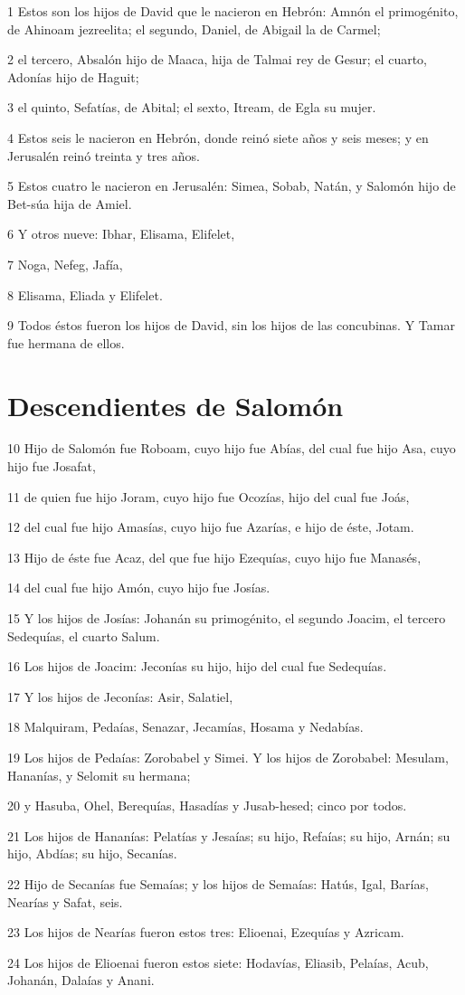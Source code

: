 \par 1 Estos son los hijos de David que le nacieron en Hebrón: Amnón el primogénito, de Ahinoam jezreelita; el segundo, Daniel, de Abigail la de Carmel;
\par 2 el tercero, Absalón hijo de Maaca, hija de Talmai rey de Gesur; el cuarto, Adonías hijo de Haguit;
\par 3 el quinto, Sefatías, de Abital; el sexto, Itream, de Egla su mujer.
\par 4 Estos seis le nacieron en Hebrón, donde reinó siete años y seis meses; y en Jerusalén reinó treinta y tres años. 
\par 5 Estos cuatro le nacieron en Jerusalén: Simea, Sobab, Natán, y Salomón hijo de Bet-súa hija de Amiel.
\par 6 Y otros nueve: Ibhar, Elisama, Elifelet,
\par 7 Noga, Nefeg, Jafía,
\par 8 Elisama, Eliada y Elifelet.
\par 9 Todos éstos fueron los hijos de David, sin los hijos de las concubinas. Y Tamar fue hermana de ellos.

\section*{Descendientes de Salomón}

\par 10 Hijo de Salomón fue Roboam, cuyo hijo fue Abías, del cual fue hijo Asa, cuyo hijo fue Josafat,
\par 11 de quien fue hijo Joram, cuyo hijo fue Ocozías, hijo del cual fue Joás,
\par 12 del cual fue hijo Amasías, cuyo hijo fue Azarías, e hijo de éste, Jotam.
\par 13 Hijo de éste fue Acaz, del que fue hijo Ezequías, cuyo hijo fue Manasés,
\par 14 del cual fue hijo Amón, cuyo hijo fue Josías.
\par 15 Y los hijos de Josías: Johanán su primogénito, el segundo Joacim, el tercero Sedequías, el cuarto Salum.
\par 16 Los hijos de Joacim: Jeconías su hijo, hijo del cual fue Sedequías.
\par 17 Y los hijos de Jeconías: Asir, Salatiel,
\par 18 Malquiram, Pedaías, Senazar, Jecamías, Hosama y Nedabías.
\par 19 Los hijos de Pedaías: Zorobabel y Simei. Y los hijos de Zorobabel: Mesulam, Hananías, y Selomit su hermana;
\par 20 y Hasuba, Ohel, Berequías, Hasadías y Jusab-hesed; cinco por todos.
\par 21 Los hijos de Hananías: Pelatías y Jesaías; su hijo, Refaías; su hijo, Arnán; su hijo, Abdías; su hijo, Secanías.
\par 22 Hijo de Secanías fue Semaías; y los hijos de Semaías: Hatús, Igal, Barías, Nearías y Safat, seis.
\par 23 Los hijos de Nearías fueron estos tres: Elioenai, Ezequías y Azricam.
\par 24 Los hijos de Elioenai fueron estos siete: Hodavías, Eliasib, Pelaías, Acub, Johanán, Dalaías y Anani.

